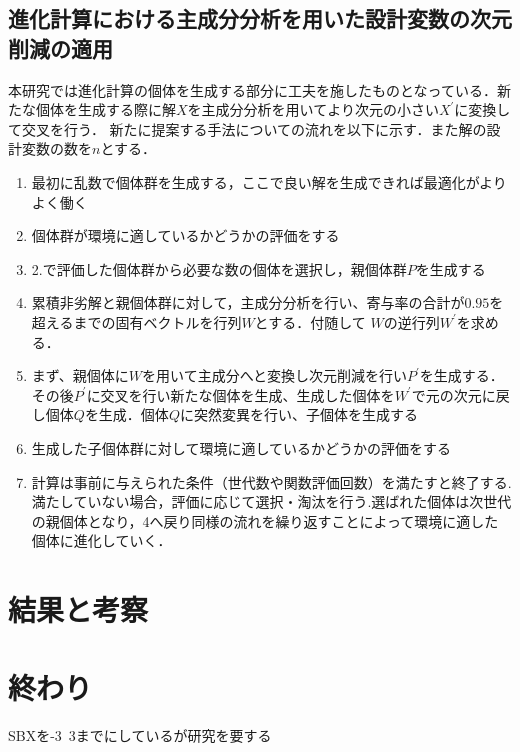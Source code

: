 \documentclass[11pt,a4j,notitlepage]{jsarticle}
\begin{document}
\subsection{進化計算における主成分分析を用いた設計変数の次元削減の適用}
\vspace{-1.0zh}
本研究では進化計算の個体を生成する部分に工夫を施したものとなっている．新たな個体を生成する際に解$X$を主成分分析を用いてより次元の小さい$X^{\prime}$に変換して交叉を行う．
新たに提案する手法についての流れを以下に示す．また解の設計変数の数を$n$とする．
\vspace{-1.5zh}
\begin{enumerate}
  \item 最初に乱数で個体群を生成する，ここで良い解を生成できれば最適化がよりよく働く
  \item 個体群が環境に適しているかどうかの評価をする
  \item 2.で評価した個体群から必要な数の個体を選択し，親個体群$P$を生成する
  \item 累積非劣解と親個体群に対して，主成分分析を行い、寄与率の合計が$0.95$を超えるまでの固有ベクトルを行列$W$とする．付随して $W$の逆行列$W^{\prime}$を求める．
  \item まず、親個体に$W$を用いて主成分へと変換し次元削減を行い$P^{\prime}$を生成する．その後$P^{\prime}$に交叉を行い新たな個体を生成、生成した個体を$W^{\prime}$で元の次元に戻し個体$Q$を生成．個体$Q$に突然変異を行い、子個体を生成する
  \item 生成した子個体群に対して環境に適しているかどうかの評価をする
  \item 計算は事前に与えられた条件（世代数や関数評価回数）を満たすと終了する.満たしていない場合，評価に応じて選択・淘汰を行う.選ばれた個体は次世代の親個体となり，4へ戻り同様の流れを繰り返すことによって環境に適した個体に進化していく．
\end{enumerate}
\vspace{-1.5zh}
\section{結果と考察}
\vspace{-1.0zh}
 

\section{終わり}
\vspace{-1.0zh}
SBXを-3~3までにしているが研究を要する
\end{document}

